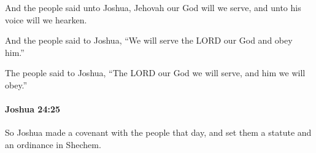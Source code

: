 			\begin{versebox}
					\item[BHS] 
					\item[ASV] And the people said unto Joshua, Jehovah our God will we serve, and unto his voice will we hearken.
					\item[NIV] And the people said to Joshua, “We will serve the LORD our God and obey him.”
					\item[NRSV] The people said to Joshua, “The LORD our God we will serve, and him we will obey.”
			\end{versebox}

		\paragraph{Joshua 24:25} %
			\label{JOSHUA-24-25}

			So Joshua made a covenant with the people that day, and set them a statute and an ordinance in Shechem.


